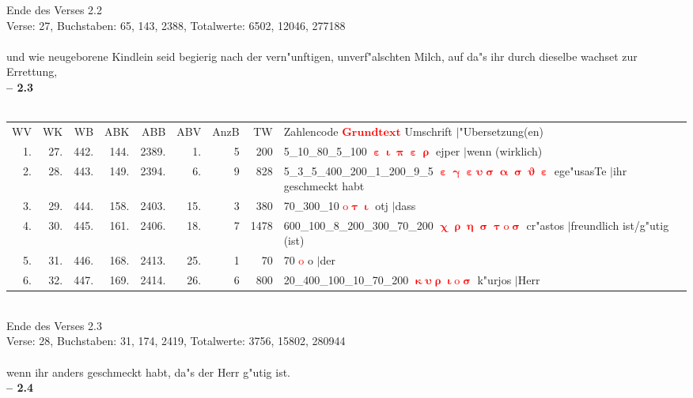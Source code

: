\documentclass[a4paper,10pt,landscape]{article}
\begin{document}
Ende des Verses 2.2\\
Verse: 27, Buchstaben: 65, 143, 2388, Totalwerte: 6502, 12046, 277188\\
\\
und wie neugeborene Kindlein seid begierig nach der vern"unftigen, unverf"alschten Milch, auf da"s ihr durch dieselbe wachset zur Errettung,\\
\newpage 
{\bf -- 2.3}\\
\medskip \\
\begin{tabular}{rrrrrrrrp{120mm}}
WV&WK&WB&ABK&ABB&ABV&AnzB&TW&Zahlencode \textcolor{red}{$\boldsymbol{Grundtext}$} Umschrift $|$"Ubersetzung(en)\\
1.&27.&442.&144.&2389.&1.&5&200&5\_10\_80\_5\_100 \textcolor{red}{$\boldsymbol{\upepsilon\upiota\uppi\upepsilon\uprho}$} ejper $|$wenn (wirklich)\\
2.&28.&443.&149.&2394.&6.&9&828&5\_3\_5\_400\_200\_1\_200\_9\_5 \textcolor{red}{$\boldsymbol{\upepsilon\upgamma\upepsilon\upsilon\upsigma\upalpha\upsigma\upvartheta\upepsilon}$} ege"usasTe $|$ihr geschmeckt habt\\
3.&29.&444.&158.&2403.&15.&3&380&70\_300\_10 \textcolor{red}{$\boldsymbol{\mathrm{o}\uptau\upiota}$} otj $|$dass\\
4.&30.&445.&161.&2406.&18.&7&1478&600\_100\_8\_200\_300\_70\_200 \textcolor{red}{$\boldsymbol{\upchi\uprho\upeta\upsigma\uptau\mathrm{o}\upsigma}$} cr"astos $|$freundlich ist/g"utig (ist)\\
5.&31.&446.&168.&2413.&25.&1&70&70 \textcolor{red}{$\boldsymbol{\mathrm{o}}$} o $|$der\\
6.&32.&447.&169.&2414.&26.&6&800&20\_400\_100\_10\_70\_200 \textcolor{red}{$\boldsymbol{\upkappa\upsilon\uprho\upiota\mathrm{o}\upsigma}$} k"urjos $|$Herr\\
\end{tabular}\medskip \\
Ende des Verses 2.3\\
Verse: 28, Buchstaben: 31, 174, 2419, Totalwerte: 3756, 15802, 280944\\
\\
wenn ihr anders geschmeckt habt, da"s der Herr g"utig ist.\\
\newpage 
{\bf -- 2.4}\\
\medskip \\
\end{document}
